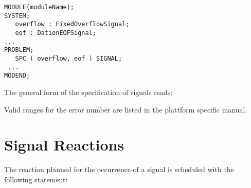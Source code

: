 \begin{lstlisting}
MODULE(moduleName);
SYSTEM;
   overflow : FixedOverflowSignal;
   eof : DationEOFSignal;
...
PROBLEM;
   SPC ( overflow, eof ) SIGNAL;
 ... 
MODEND;
\end{lstlisting}

The general form of the specification of signals reads:

\begin{grammarframe}
\end{grammarframe}


%

Valid ranges for the error number are listed in the plattform specific manual.


\section{Signal Reactions}
\label{sec_signal_reactions}
The reaction planned for the occurrence of a signal is scheduled with
the following statement:


